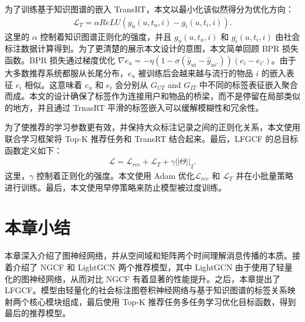 为了训练基于知识图谱的嵌入 TransRT，本文以最小化该似然得分为优化方向：
\begin{gather}
    \mathcal{L}_{T} = \alpha ReLU(g_u(u, t_u, i) - g_i(u, t_i, i)).
\end{gather}
这里的 $\alpha$ 控制着知识图谱正则化的强度，并且 $g_u(u, t_u, i)$ 和 $g_i(u, t_i, i)$ 由社会标注数据计算得到。为了更清楚的展示本文设计的意图，本文简单回顾 BPR 损失函数。BPR 损失通过梯度优化 $\nabla e_u = -\eta (1 - \sigma(\hat{y}_{ui} - \hat{y}_{ui'}))(e_i - e_{i'})$。由于大多数推荐系统都服从长尾分布，$e_u$ 被训练后会越来越与流行的物品 $i$ 的嵌入表征 $e_i$ 相似。这意味着 $e_u$ 和 $e_i$ 会分别从 $G_{UT}$ and $G_{IT}$ 中不同的标签表征嵌入聚合而成。本文的设计确保了标签作为连接用户和物品的桥梁，而不是停留在局部类似的地方，并且通过 TrnasRT 平滑的标签嵌入可以缓解模糊性和冗余性。

为了使推荐的学习参数更有效，并保持大众标注记录之间的正则化关系，本文使用联合学习框架将 Top-K 推荐任务和 TransRT 结合起来。最后，LFGCF 的总目标函数定义如下：
\begin{gather}
    \mathcal{L} = \mathcal{L}_{rec} + \mathcal{L}_{T} + \gamma ||\Theta||_2.
\end{gather}
这里，$\gamma$ 控制着正则化的强度。本文使用 Adam\cite{kingma_adam_2014} 优化$\mathcal{L}_{rec}$ 和 $\mathcal{L}_{T}$ 并在小批量策略进行训练。最后，本文使用早停策略来防止模型被过度训练。

\section{本章小结}
本章深入介绍了图神经网络，并从空间域和矩阵两个时间理解消息传播的本质。接着介绍了 NGCF 和 LightGCN 两个推荐模型，其中 LightGCN 由于使用了轻量化的图神经网络，从而对比 NGCF 有着显著的性能提升。之后，本章提出了 LFGCF。模型由轻量化的社会标注图卷积神经网络与基于知识图谱的标签关系映射两个核心模块组成，最后使用 Top-K 推荐任务多任务学习优化目标函数，得到最后的推荐模型。
